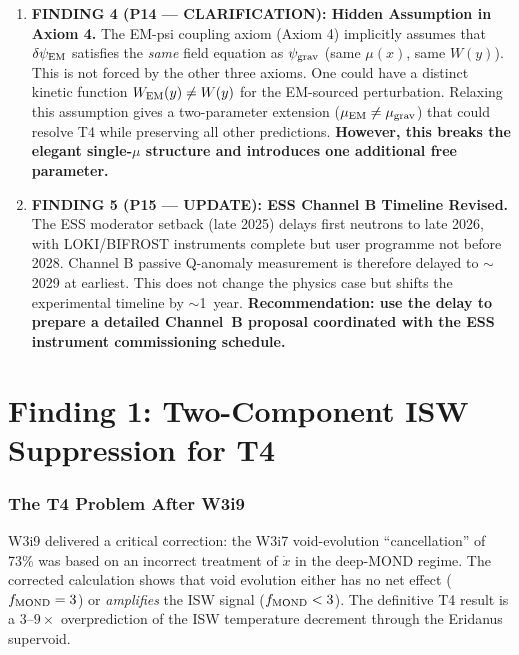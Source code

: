 \documentclass[11pt]{article}
\newcommand{\psigrav}{\psi_{\rm grav}}
\newcommand{\dpsiEM}{\delta\psi_{\rm EM}}
\newcommand{\mufd}{\mu}
\begin{document}
\begin{tcolorbox}[colback=blue!5!white, colframe=blue!60!black,
  title=\textbf{W4i10 TOP 5 FINDINGS}]
\begin{enumerate}
\item \textbf{FINDING 4 (P14 --- CLARIFICATION): Hidden Assumption in
  Axiom 4.} The EM-psi coupling axiom (Axiom 4) implicitly assumes
  that $\dpsiEM$ satisfies the \emph{same} field equation as $\psigrav$
  (same $\mufd(x)$, same $W(y)$). This is not forced by the other
  three axioms. One could have a distinct kinetic function $W_{\rm EM}(y)
  \neq W(y)$ for the EM-sourced perturbation. Relaxing this assumption
  gives a two-parameter extension ($\mufd_{\rm EM} \neq \mufd_{\rm grav}$)
  that could resolve T4 while preserving all other predictions.
  \textbf{However, this breaks the elegant single-$\mufd$ structure
  and introduces one additional free parameter.}

\item \textbf{FINDING 5 (P15 --- UPDATE): ESS Channel B Timeline Revised.}
  The ESS moderator setback (late 2025) delays first neutrons to late
  2026, with LOKI/BIFROST instruments complete but user programme not
  before 2028. Channel B passive Q-anomaly measurement is therefore
  delayed to $\sim$2029 at earliest. This does not change the physics
  case but shifts the experimental timeline by $\sim$1~year.
  \textbf{Recommendation: use the delay to prepare a detailed Channel~B
  proposal coordinated with the ESS instrument commissioning schedule.}
\end{enumerate}
\end{tcolorbox}


\part{Finding 1: Two-Component ISW Suppression for T4}
\label{part:T4}

\section{The T4 Problem After W3i9}

W3i9 delivered a critical correction: the W3i7 void-evolution
``cancellation'' of 73\% was based on an incorrect treatment of
$\dot{x}$ in the deep-MOND regime. The corrected calculation shows
that void evolution either has no net effect ($f_{\rm MOND} = 3$) or
\emph{amplifies} the ISW signal ($f_{\rm MOND} < 3$). The definitive
T4 result is a $3$--$9\times$ overprediction of the ISW temperature
decrement through the Eridanus supervoid.
\end{document}
